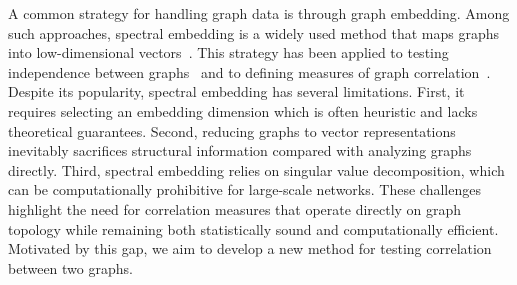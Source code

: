 \documentclass[letterpaper,11pt]{article}
\theoremstyle{definition}
\begin{document}
A common strategy for handling graph data is through graph embedding. Among such approaches, spectral embedding is a widely used method that maps graphs into low-dimensional vectors~\citep{rohe2011spectral}. %
This strategy has been applied to testing independence between graphs~\citep{lee2019network} and to defining measures of graph correlation~\citep{fujita2017correlation}.
Despite its popularity, spectral embedding has several limitations. First, it requires selecting an embedding dimension which is often heuristic and lacks theoretical guarantees. Second, reducing graphs to vector representations inevitably sacrifices structural information compared with analyzing graphs directly. Third, spectral embedding relies on singular value decomposition, which can be computationally prohibitive for large-scale networks.
These challenges highlight the need for correlation measures that operate directly on graph topology while remaining both statistically sound and computationally efficient. Motivated by this gap, we aim to develop a new method for testing correlation between two graphs.

\end{document}
